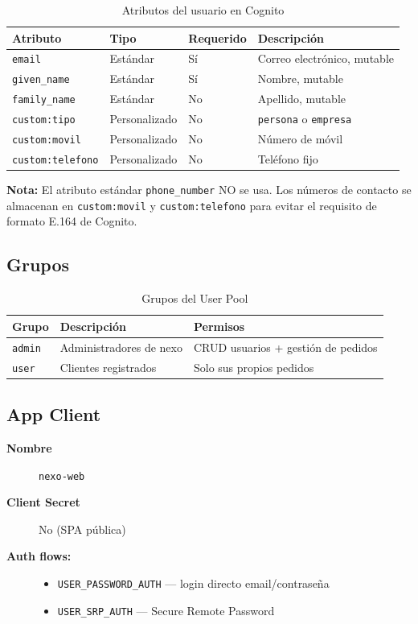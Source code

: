 \documentclass[12pt,a4paper]{article}
\begin{document}
\begin{table}[H]
\centering
\begin{tabular}{@{}llll@{}}
\toprule
\textbf{Atributo} & \textbf{Tipo} & \textbf{Requerido} & \textbf{Descripción} \\
\midrule
\texttt{email} & Estándar & Sí & Correo electrónico, mutable \\
\texttt{given\_name} & Estándar & Sí & Nombre, mutable \\
\texttt{family\_name} & Estándar & No & Apellido, mutable \\
\texttt{custom:tipo} & Personalizado & No & \texttt{persona} o \texttt{empresa} \\
\texttt{custom:movil} & Personalizado & No & Número de móvil \\
\texttt{custom:telefono} & Personalizado & No & Teléfono fijo \\
\bottomrule
\end{tabular}
\caption{Atributos del usuario en Cognito}
\end{table}

\begin{nexobox}
\textbf{Nota:} El atributo estándar \texttt{phone\_number} NO se usa. Los números
de contacto se almacenan en \texttt{custom:movil} y \texttt{custom:telefono} para
evitar el requisito de formato E.164 de Cognito.
\end{nexobox}

\subsection{Grupos}

\begin{table}[H]
\centering
\begin{tabular}{@{}lll@{}}
\toprule
\textbf{Grupo} & \textbf{Descripción} & \textbf{Permisos} \\
\midrule
\texttt{admin} & Administradores de nexo & CRUD usuarios + gestión de pedidos \\
\texttt{user} & Clientes registrados & Solo sus propios pedidos \\
\bottomrule
\end{tabular}
\caption{Grupos del User Pool}
\end{table}

\subsection{App Client}

\begin{description}
  \item[\textbf{Nombre}] \texttt{nexo-web}
  \item[\textbf{Client Secret}] No (SPA pública)
  \item[\textbf{Auth flows:}]
    \begin{itemize}
      \item \texttt{USER\_PASSWORD\_AUTH} --- login directo email/contraseña
      \item \texttt{USER\_SRP\_AUTH} --- Secure Remote Password
    \end{itemize}
\end{description}
\end{document}
